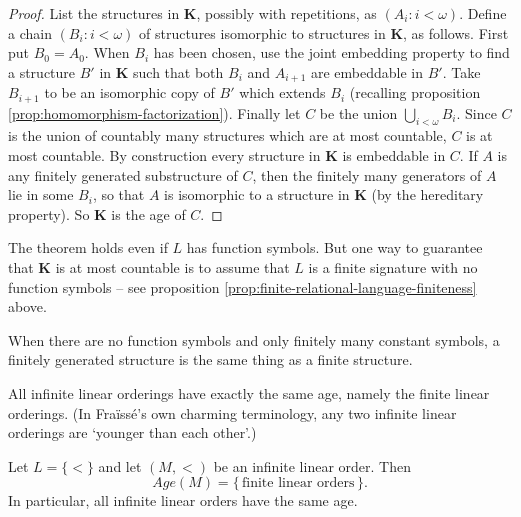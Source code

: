 \begin{proof}
    List the structures in \( \mathbf{K} \), possibly with repetitions, as \( (A_i : i < \omega) \). Define a chain \( (B_i : i < \omega) \) of structures isomorphic to structures in \( \mathbf{K} \), as follows. First put \( B_0 = A_0 \). When \( B_i \) has been chosen, use the joint embedding property to find a structure \( B' \) in \( \mathbf{K} \) such that both \( B_i \) and \( A_{i+1} \) are embeddable in \( B' \). Take \( B_{i+1} \) to be an isomorphic copy of \( B' \) which extends \( B_i \) (recalling proposition \ref{prop:homomorphism-factorization}). Finally let \( C \) be the union \( \bigcup_{i<\omega} B_i \). Since \( C \) is the union of countably many structures which are at most countable, \( C \) is at most countable. By construction every structure in \( \mathbf{K} \) is embeddable in \( C \). If \( A \) is any finitely generated substructure of \( C \), then the finitely many generators of \( A \) lie in some \( B_i \), so that \( A \) is isomorphic to a structure in \( \mathbf{K} \) (by the hereditary property). So \( \mathbf{K} \) is the age of \( C \).
\end{proof}



The theorem holds even if \( L \) has function symbols. But one way to guarantee that \( \mathbf{K} \) is at most countable is to assume that \( L \) is a finite signature with no function symbols -- see proposition \ref{prop:finite-relational-language-finiteness} above.

When there are no function symbols and only finitely many constant symbols, a finitely generated structure is the same thing as a finite structure.


All infinite linear orderings have exactly the same age, namely the finite linear orderings. (In Fraïssé’s own charming terminology, any two infinite linear orderings are ‘younger than each other’.)


\begin{proposition}
    Let $L=\{<\}$ and let $(M,<)$ be an infinite linear order. Then
    \[
        Age(M)=\{\,\text{finite linear orders}\,\}.
    \]
    In particular, all infinite linear orders have the same age.
\end{proposition}

